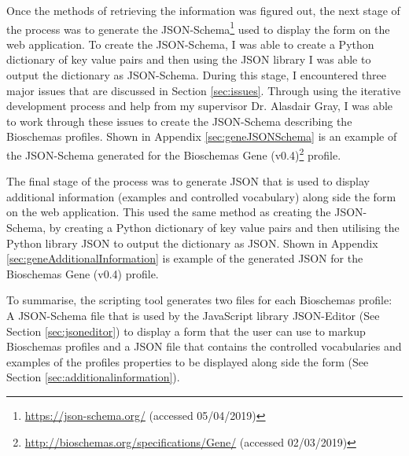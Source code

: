 Once the methods of retrieving the information was figured out, the next stage of the process was to generate the JSON-Schema\footnote{\url{https://json-schema.org/} (accessed 05/04/2019)} used to display the form on the web application. To create the JSON-Schema, I was able to create a Python dictionary of key value pairs and then using the JSON library I was able to output the dictionary as JSON-Schema. During this stage, I encountered three major issues that are discussed in Section \ref{sec:issues}. Through using the iterative development process and help from my supervisor Dr. Alasdair Gray, I was able to work through these issues to create the JSON-Schema describing the Bioschemas profiles. Shown in Appendix \ref{sec:geneJSONSchema} is an example of the JSON-Schema generated for the Bioschemas Gene (v0.4)\footnote{\url{http://bioschemas.org/specifications/Gene/} (accessed 02/03/2019)} profile.

The final stage of the process was to generate JSON that is used to display additional information (examples and controlled vocabulary) along side the form on the web application. This used the same method as creating the JSON-Schema, by creating a Python dictionary of key value pairs and then utilising the Python library JSON to output the dictionary as JSON. Shown in Appendix \ref{sec:geneAdditionalInformation} is example of the generated JSON for the Bioschemas Gene (v0.4) profile.

To summarise, the scripting tool generates two files for each Bioschemas profile: A JSON-Schema file that is used by the JavaScript library JSON-Editor (See Section \ref{sec:jsoneditor}) to display a form that the user can use to markup Bioschemas profiles and a JSON file that contains the controlled vocabularies and examples of the profiles properties to be displayed along side the form (See Section \ref{sec:additionalinformation}).


